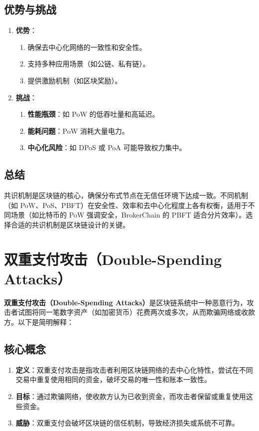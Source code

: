 \documentclass[12pt]{ctexart}
\begin{document}
\subsection{优势与挑战}
\begin{enumerate}
    \item \textbf{优势}：
        \begin{enumerate}
            \item 确保去中心化网络的一致性和安全性。
            \item 支持多种应用场景（如公链、私有链）。
            \item 提供激励机制（如区块奖励）。
        \end{enumerate}
    \item \textbf{挑战}：
        \begin{enumerate}
            \item \textbf{性能瓶颈}：如 PoW 的低吞吐量和高延迟。
            \item \textbf{能耗问题}：PoW 消耗大量电力。
            \item \textbf{中心化风险}：如 DPoS 或 PoA 可能导致权力集中。
        \end{enumerate}
\end{enumerate}

\subsection{总结}
共识机制是区块链的核心，确保分布式节点在无信任环境下达成一致。不同机制（如 PoW、PoS、PBFT）在安全性、效率和去中心化程度上各有权衡，适用于不同场景（如比特币的 PoW 强调安全，BrokerChain 的 PBFT 适合分片效率）。选择合适的共识机制是区块链设计的关键。


\newpage

\section{双重支付攻击（Double-Spending Attacks）}
\textbf{双重支付攻击（Double-Spending Attacks）}是区块链系统中一种恶意行为，攻击者试图将同一笔数字资产（如加密货币）花费两次或多次，从而欺骗网络或收款方。以下是简明解释：

\subsection{核心概念}
\begin{enumerate}
    \item \textbf{定义}：双重支付攻击是指攻击者利用区块链网络的去中心化特性，尝试在不同交易中重复使用相同的资金，破坏交易的唯一性和账本一致性。
    \item \textbf{目标}：通过欺骗网络，使收款方认为已收到资金，而攻击者保留或重复使用这些资金。
    \item \textbf{威胁}：双重支付会破坏区块链的信任机制，导致经济损失或系统不可靠。
\end{enumerate}
\end{document}
